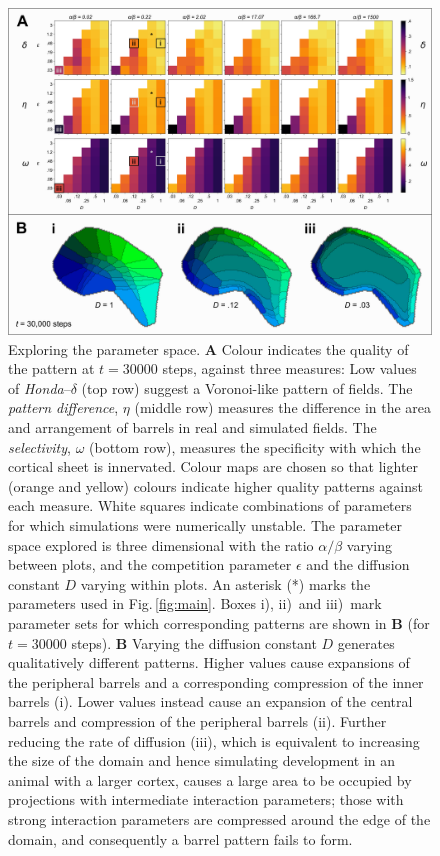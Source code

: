 \documentclass[9pt,lineno]{elife}
\newcommand{\cmnt}[1]{\textcolor{colcmnt}{#1}}
\begin{document}
\begin{figure}
  \begin{fullwidth}
    \includegraphics[width=\linewidth]{./Fig2.png}
    \caption{\cmnt{Exploring the parameter space.
        \textbf{A} Colour indicates the quality of the pattern at $t=30000$
        steps, against three measures: Low values of \emph{Honda}--$\delta$
        (top row) suggest a Voronoi-like pattern of fields. The \emph{pattern
          difference}, $\eta$ (middle row) measures the difference in the area
        and arrangement of barrels in real and simulated fields. The
        \emph{selectivity}, $\omega$ (bottom row), measures the specificity
        with which the cortical sheet is innervated. Colour maps are chosen so
        that lighter (orange and yellow) colours indicate higher quality
        patterns against each measure. White squares indicate combinations of
        parameters for which simulations were numerically unstable.
        The parameter space explored is three dimensional with the ratio
        $\alpha/\beta$ varying between plots, and the competition parameter
        $\epsilon$ and the diffusion constant $D$ varying within plots. An
        asterisk (*) marks the parameters used in Fig.\,\ref{fig:main}. Boxes
        i), ii)~and iii)~mark parameter sets for which corresponding patterns
        are shown in \textbf{B} (for $t=30000$ steps).
        \textbf{B} Varying the diffusion constant $D$ generates qualitatively
        different patterns. Higher values cause expansions of the peripheral
        barrels and a corresponding compression of the inner barrels
        (i). Lower values instead cause an expansion of the central barrels
        and compression of the peripheral barrels (ii). Further reducing the
        rate of diffusion (iii), which is equivalent to increasing the size of
        the domain and hence simulating development in an animal with a larger
        cortex, causes a large area to be occupied by projections with
        intermediate interaction parameters; those with strong interaction
        parameters are compressed around the edge of the domain, and
        consequently a barrel pattern fails to form.}}
    \label{fig:paramsweep}
  \end{fullwidth}
\end{figure}
\end{document}
